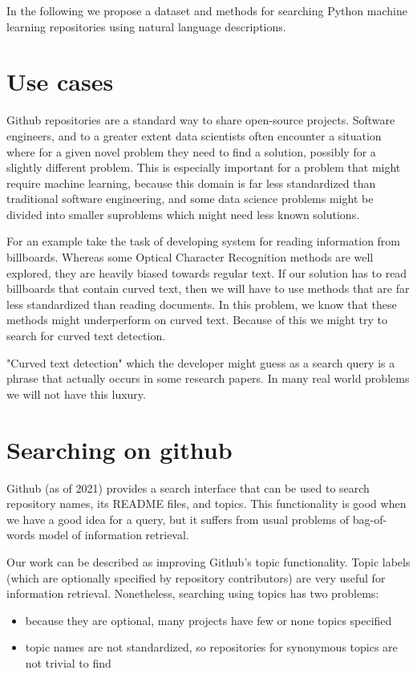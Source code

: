 \documentclass[11pt]{report}
\begin{document}
In the following we propose a dataset and methods for searching Python machine learning repositories using natural language descriptions.

\section{Use cases}


Github repositories are a standard way to share open-source projects.
Software engineers, and to a greater extent data scientists often encounter a situation where for a given novel problem they need to find a solution, possibly for a slightly different problem.
This is especially important for a problem that might require machine learning, because this domain is far less standardized than traditional software engineering, and some data science problems might be divided into smaller suproblems which might need less known solutions.

For an example take the task of developing system for reading information from billboards.
Whereas some Optical Character Recognition methods are well explored, they are heavily biased towards regular text.
If our solution has to read billboards that contain curved text, then we will have to use methods that are far less standardized than reading documents.
In this problem, we know that these methods might underperform on curved text. Because of this we might try to search for curved text detection.

"Curved text detection" which the developer might guess as a search query is a phrase that actually occurs in some research papers. In many real world problems we will not have this luxury.

\section{Searching on github}
\label{intro_searching_github}

Github (as of 2021) provides a search interface that can be used to search repository names, its README files, and topics.
This functionality is good when we have a good idea for a query, but it suffers from usual problems of bag-of-words model of information retrieval.

Our work can be described as improving Github's topic functionality. Topic labels (which are optionally specified by repository contributors) are very useful for information retrieval.
Nonetheless, searching using topics has two problems:
\begin{itemize}
\item because they are optional, many projects have few or none topics specified
\item topic names are not standardized, so repositories for synonymous topics are not trivial to find
\end{itemize}
\end{document}

